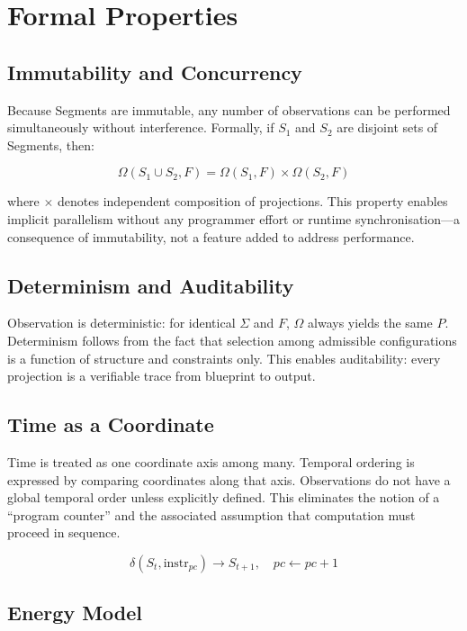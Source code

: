 \documentclass[
  a4paper,
  DIV=11,
  numbers=noendperiod]{scrartcl}
\begin{document}
\section{Formal Properties}\label{formal-properties}

\subsection{Immutability and
Concurrency}\label{immutability-and-concurrency}

Because Segments are immutable, any number of observations can be
performed simultaneously without interference. Formally, if \(S_1\) and
\(S_2\) are disjoint sets of Segments, then:

\[ \Omega(S_1 \cup S_2, F) = \Omega(S_1, F) \times \Omega(S_2, F) \]

where \(\times\) denotes independent composition of projections. This
property enables implicit parallelism without any programmer effort or
runtime synchronisation---a consequence of immutability, not a feature
added to address performance.

\subsection{Determinism and
Auditability}\label{determinism-and-auditability}

Observation is deterministic: for identical \(\Sigma\) and \(F\),
\(\Omega\) always yields the same \(P\). Determinism follows from the
fact that selection among admissible configurations is a function of
structure and constraints only. This enables auditability: every
projection is a verifiable trace from blueprint to output.

\subsection{Time as a Coordinate}\label{time-as-a-coordinate}

Time is treated as one coordinate axis among many. Temporal ordering is
expressed by comparing coordinates along that axis. Observations do not
have a global temporal order unless explicitly defined. This eliminates
the notion of a ``program counter'' and the associated assumption that
computation must proceed in sequence.

\[\delta(S_t, \text{instr}_{pc}) \to S_{t+1}, \quad pc \leftarrow pc + 1\]

\subsection{Energy Model}\label{energy-model}
\end{document}
